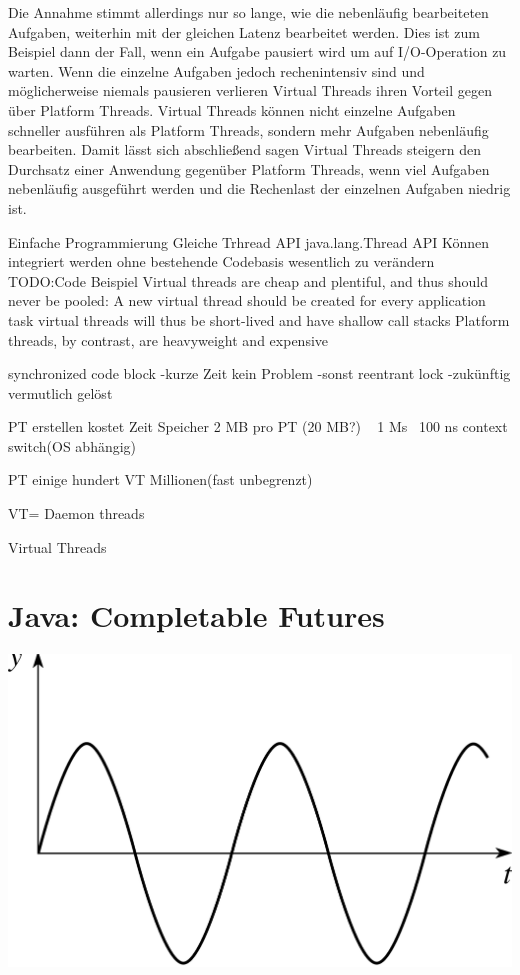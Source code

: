 \documentclass[fontsize=12pt,paper=a4,twoside=semi,parskip=half-,headsepline,headinclude]{scrreprt}
\begin{document}
Die Annahme stimmt allerdings nur so lange, wie die nebenläufig bearbeiteten Aufgaben, weiterhin mit der gleichen Latenz bearbeitet werden. Dies ist zum Beispiel dann der Fall, wenn ein Aufgabe pausiert wird um auf I/O-Operation zu warten. Wenn die einzelne Aufgaben jedoch rechenintensiv sind und möglicherweise niemals pausieren verlieren Virtual Threads ihren Vorteil gegen über Platform Threads. Virtual Threads können nicht einzelne Aufgaben schneller ausführen als Platform Threads, sondern mehr Aufgaben nebenläufig bearbeiten. Damit lässt sich abschließend sagen Virtual Threads steigern den Durchsatz einer Anwendung gegenüber Platform Threads, wenn viel Aufgaben nebenläufig ausgeführt werden und die Rechenlast der einzelnen Aufgaben niedrig ist.



Einfache Programmierung
Gleiche Trhread API
java.lang.Thread API
Können integriert werden ohne bestehende Codebasis wesentlich zu verändern
TODO:Code Beispiel
Virtual threads are cheap and plentiful, and thus should never be pooled: 
A new virtual thread should be created for every application task
virtual threads will thus be short-lived and have shallow call stacks
Platform threads, by contrast, are heavyweight and expensive

synchronized code block
-kurze Zeit kein Problem
-sonst reentrant lock
-zukünftig vermutlich gelöst

PT erstellen kostet Zeit Speicher
2 MB pro PT (20 MB?)
~ 1 Ms
~100 ns context switch(OS abhängig)

PT
einige hundert
VT
Millionen(fast unbegrenzt)

VT= Daemon threads

Virtual Threads \cite{Karsten2020}

\section{Java: Completable Futures}

\includegraphics[scale=2.5]{figures/example.png}
\end{document}
